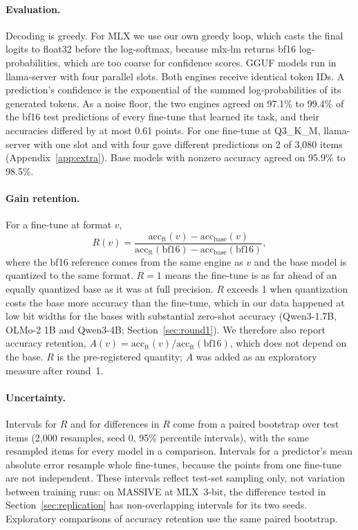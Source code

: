 \documentclass[10pt]{article}
\begin{document}
\paragraph{Evaluation.} Decoding is greedy. For MLX we use our own greedy loop, which casts the final logits to float32 before the log-softmax, because mlx-lm returns bf16 log-probabilities, which are too coarse for confidence scores. GGUF models run in llama-server with four parallel slots. Both engines receive identical token IDs. A prediction's confidence is the exponential of the summed log-probabilities of its generated tokens. As a noise floor, the two engines agreed on 97.1\% to 99.4\% of the bf16 test predictions of every fine-tune that learned its task, and their accuracies differed by at most 0.61 points. For one fine-tune at Q3\_K\_M, llama-server with one slot and with four gave different predictions on 2 of 3,080 items (Appendix~\ref{app:extra}). Base models with nonzero accuracy agreed on 95.9\% to 98.5\%.

\paragraph{Gain retention.} For a fine-tune at format $v$,
\begin{equation}
R(v) = \frac{\mathrm{acc}_{\mathrm{ft}}(v) - \mathrm{acc}_{\mathrm{base}}(v)}{\mathrm{acc}_{\mathrm{ft}}(\mathrm{bf16}) - \mathrm{acc}_{\mathrm{base}}(\mathrm{bf16})},
\end{equation}
where the bf16 reference comes from the same engine as $v$ and the base model is quantized to the same format. $R = 1$ means the fine-tune is as far ahead of an equally quantized base as it was at full precision. $R$ exceeds 1 when quantization costs the base more accuracy than the fine-tune, which in our data happened at low bit widths for the bases with substantial zero-shot accuracy (Qwen3-1.7B, OLMo-2 1B and Qwen3-4B; Section~\ref{sec:round1}). We therefore also report accuracy retention, $A(v) = \mathrm{acc}_{\mathrm{ft}}(v) / \mathrm{acc}_{\mathrm{ft}}(\mathrm{bf16})$, which does not depend on the base. $R$ is the pre-registered quantity; $A$ was added as an exploratory measure after round~1.

\paragraph{Uncertainty.} Intervals for $R$ and for differences in $R$ come from a paired bootstrap over test items (2,000 resamples, seed 0, 95\% percentile intervals), with the same resampled items for every model in a comparison. Intervals for a predictor's mean absolute error resample whole fine-tunes, because the points from one fine-tune are not independent. These intervals reflect test-set sampling only, not variation between training runs: on MASSIVE at MLX~3-bit, the difference tested in Section~\ref{sec:replication} has non-overlapping intervals for its two seeds. Exploratory comparisons of accuracy retention use the same paired bootstrap.
\end{document}
